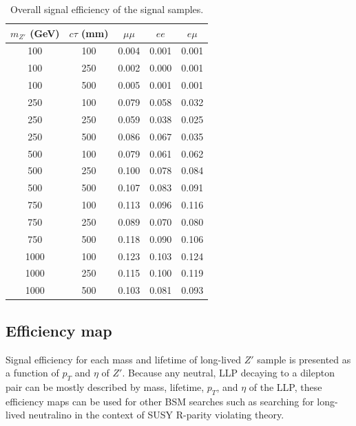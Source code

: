 \begin{table}[!htb]
  \centering
  \begin{tabular}{ c c @{\hspace{1cm}} c @{\hspace{1cm}} c @{\hspace{1cm}} c }
    \hline
    \hline
    $m_{Z'}$ (GeV) & $c\tau$ (mm)   &$\mu\mu$  & $ee$  & $e\mu$ \\
    \hline
    100			   &  100	        &0.004	&0.001	&0.001   \\
    100			   &  250	        &0.002	&0.000	&0.001   \\
    100			   &  500	        &0.005	&0.001	&0.001   \\
    250			   &  100	        &0.079	&0.058	&0.032   \\
    250			   &  250	        &0.059	&0.038	&0.025   \\
    250			   &  500	        &0.086	&0.067	&0.035   \\
    500			   &  100	        &0.079	&0.061	&0.062   \\
    500			   &  250	        &0.100	&0.078	&0.084   \\
    500			   &  500	        &0.107	&0.083	&0.091   \\
    750			   &  100	        &0.113	&0.096	&0.116   \\
    750			   &  250	        &0.089	&0.070	&0.080   \\
    750			   &  500	        &0.118	&0.090	&0.106   \\
    1000	       &  100	        &0.123	&0.103	&0.124   \\
    1000	       &  250	        &0.115	&0.100	&0.119   \\
    1000	       &  500	        &0.103	&0.081	&0.093   \\
    \hline
    \hline
  \end{tabular}
  \caption{Overall signal efficiency of the signal samples.}
  \label{table:signal_eff}
\end{table}




\subsection{Efficiency map}
\label{sec:efficiency_map}
Signal efficiency for each mass and lifetime of long-lived $Z'$ sample is presented as a function of $p_{T}$ and $\eta$ of $Z'$. Because any neutral, LLP decaying to a dilepton pair can be mostly described by mass, lifetime, $p_{T}$, and $\eta$ of the LLP, these efficiency maps can be used for other BSM searches such as searching for long-lived neutralino in the context of SUSY R-parity violating theory.

